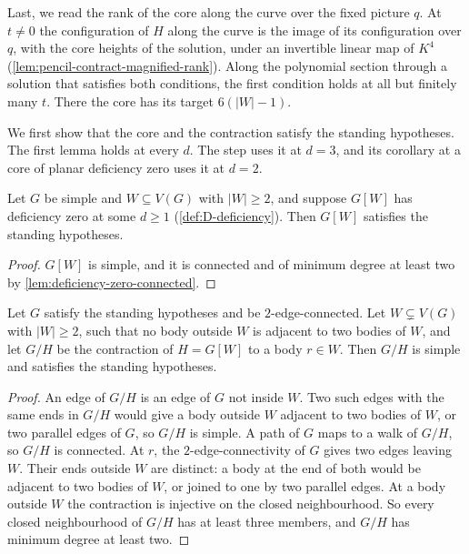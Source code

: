 Last, we read the rank of the core along the curve over the fixed
picture $q$. At $t \neq 0$ the configuration of $H$ along the curve is
the image of its configuration over $q$, with the core heights of the
solution, under an invertible linear map of $K^4$
(\cref{lem:pencil-contract-magnified-rank}). Along the polynomial
section through a solution that satisfies both conditions, the first
condition holds at all but finitely many $t$. There the core has its
target $6(|W| - 1)$.

We first show that the core and the contraction satisfy the standing
hypotheses. The first lemma holds at every $d$. The step uses it at
$d = 3$, and its corollary at a core of planar deficiency zero uses it
at $d = 2$.

\begin{lemma}
  \label{lem:pencil-contract-standing-rigid}
  \leanok
  Let $G$ be simple and $W \subseteq V(G)$ with $|W| \ge 2$, and suppose
  $G[W]$ has deficiency zero at some $d \ge 1$
  (\cref{def:D-deficiency}). Then $G[W]$ satisfies the standing
  hypotheses.
\end{lemma}
\begin{proof}
  \leanok
  $G[W]$ is simple, and it is connected and of minimum degree at least
  two by \cref{lem:deficiency-zero-connected}.
\end{proof}

\begin{lemma}
  \label{lem:pencil-contract-standing}
  \leanok
  Let $G$ satisfy the standing hypotheses and be $2$-edge-connected. Let
  $W \subsetneq V(G)$ with $|W| \ge 2$, such that no body outside $W$ is
  adjacent to two bodies of $W$, and let $G/H$ be the contraction of
  $H = G[W]$ to a body $r \in W$. Then $G/H$ is simple and satisfies the
  standing hypotheses.
\end{lemma}
\begin{proof}
  \leanok
  An edge of $G/H$ is an edge of $G$ not inside $W$. Two such edges with
  the same ends in $G/H$ would give a body outside $W$ adjacent to two
  bodies of $W$, or two parallel edges of $G$, so $G/H$ is simple. A path
  of $G$ maps to a walk of $G/H$, so $G/H$ is connected. At $r$, the
  $2$-edge-connectivity of $G$ gives two
  edges leaving $W$. Their ends outside $W$ are distinct: a body at the
  end of both would be adjacent to two bodies of $W$, or joined to one by
  two parallel edges. At a body outside $W$ the contraction is injective
  on the closed neighbourhood. So every closed neighbourhood of $G/H$ has
  at least three members, and $G/H$ has minimum degree at least two.
\end{proof}


